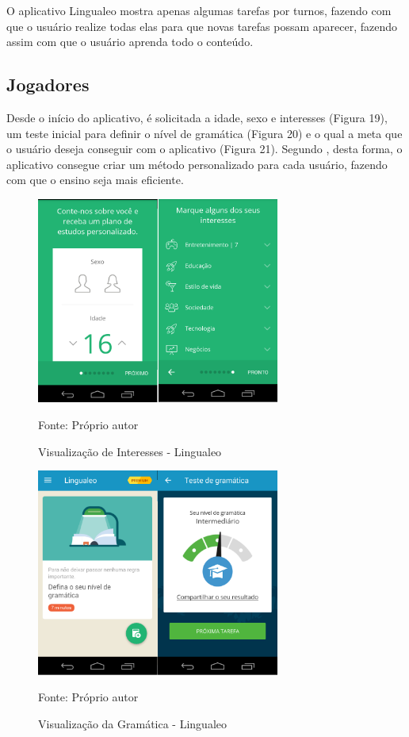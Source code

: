 \documentclass[
	12pt,				%
	openany,			%
	oneside,			%
	a4paper,			%
	english,			%
	french,				%
	spanish,			%
	brazil				%
	]{abntex2}
\begin{document}
O aplicativo Lingualeo mostra apenas algumas tarefas por turnos, fazendo com que o usuário realize todas elas para que novas tarefas possam aparecer, fazendo assim com que o usuário aprenda todo o conteúdo.

\subsection{Jogadores}

Desde o início do aplicativo, é solicitada a idade, sexo e interesses (Figura 19), um teste inicial para definir o nível de gramática (Figura 20) e o qual a meta que o usuário deseja conseguir com o aplicativo (Figura 21). Segundo , desta forma, o aplicativo consegue criar um método personalizado para cada usuário, fazendo com que o ensino seja mais eficiente. 

\begin{figure}[H]
    \centering
\caption{Visualização de Interesses - Lingualeo}
\includegraphics[width=8cm]{figuras/interesseslingualeo.png}
\par
 Fonte: Próprio autor
\end{figure}

\begin{figure}[H]
    \centering
\caption{Visualização da Gramática - Lingualeo}
\includegraphics[width=8cm]{figuras/gramaticalingualeo.png}
\par
 Fonte: Próprio autor
\end{figure}
\end{document}

